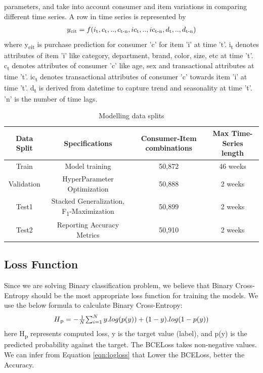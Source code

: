 parameters, and take into account consumer and item variations in comparing different time series. A row 
in time series is represented by
  \begin{equation}
    \begin{array}{l}
      y\textsubscript{cit}  = f(i\textsubscript{t}, c\textsubscript{t},..,c\textsubscript{t-n}, ic\textsubscript{t}
      ,..,ic\textsubscript{t-n}, d\textsubscript{t},..,d\textsubscript{t-n})
    \end{array}
    \label{eqn:fx}
  \end{equation}
where y\textsubscript{cit} is purchase prediction for consumer 'c' for item ’i’ at time ’t’. 
i\textsubscript{t} denotes attributes of item ’i’ like category, department, brand, color, size, etc at time 't'. 
c\textsubscript{t} denotes attributes of consumer 'c' like age, sex and transactional attributes at time 't'. 
ic\textsubscript{t} denotes transactional attributes of consumer 'c'  towards item 'i' at time 't'. 
d\textsubscript{t} is derived from datetime to capture trend and seasonality at time 't'. 
'n' is the number of time lags.
\begin{table}[t]
\caption{Modelling data splits}
\vspace{0.1 in}
\centering
\resizebox{3.3in}{!}
{%
\begin{tabular}{|c|c|c|c|}
\hline
{\bf Data Split} & {\bf Specifications} & {\bf Consumer-Item combinations} & {\bf Max Time-Series length} \\  
\hline\hline
Train  		&  Model training &  50,872 &  46 weeks \\ \hline
Validation	  		&  HyperParameter Optimization &  50,888 &  2 weeks \\ \hline
Test1  		&  Stacked Generalization, F\textsubscript{1}-Maximization & 50,899 &  2 weeks\\ \hline
Test2	  		&  Reporting Accuracy Metrics & 50,910 &  2 weeks\\
\hline
\end{tabular}
}
\label{tab:datasplit}
\end{table}
\subsection{Loss Function}
Since we are solving Binary classification problem, we believe that Binary Cross-Entropy should be the most appropriate 
loss function for training the models. We use the below formula to calculate Binary Cross-Entropy:
  \begin{equation}
      \begin{array}{l}
        H\textsubscript{p} = - \frac{1}{N}$$\sum_{i=1}^{N}y.log(p(y))+
        (1- y).log(1-p(y))
      \end{array}
    \label{eqn:logloss}
  \end{equation}
here H\textsubscript{p} represents computed loss, y is the target value (label), and p(y) 
is the predicted probability against the target. The BCELoss takes non-negative values. We can infer 
from Equation \ref{eqn:logloss} that Lower the BCELoss, better the Accuracy.
